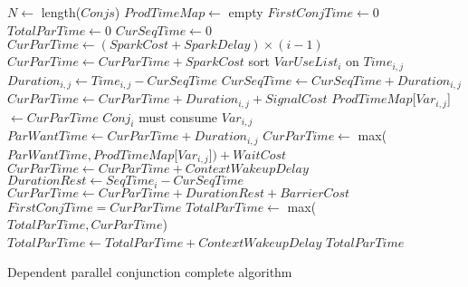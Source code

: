 {\begin{algorithm}
\begin{algorithmic}
    \State $N \gets$ length($Conjs$)
    \State $ProdTimeMap \gets$ empty
    \State $FirstConjTime \gets 0$
    \State $TotalParTime \gets 0$
        \State $CurSeqTime \gets 0$
        \State $CurParTime \gets (SparkCost + SparkDelay) \times (i-1)$
            \State $CurParTime \gets CurParTime + SparkCost$
        \EndIf
        \State sort $VarUseList_i$ on $Time_{i, j}$
            \State $Duration_{i, j} \gets Time_{i, j} - CurSeqTime$
            \State $CurSeqTime \gets CurSeqTime + Duration_{i, j}$
                \State $CurParTime \gets
                    CurParTime + Duration_{i, j} + SignalCost$
                \State $ProdTimeMap$[$Var_{i, j}$]$ \gets CurParTime$
            \Else \Comment $Conj_i$ must consume $Var_{i, j}$
                \State $ParWantTime \gets CurParTime + Duration_{i, j}$
                \State $CurParTime \gets$
                    max($ParWantTime, ProdTimeMap$[$Var_{i, j}$]$) + WaitCost$
                    \State $CurParTime \gets CurParTime + ContextWakeupDelay$
                \EndIf
            \EndIf
        \EndFor
        \State $DurationRest \gets SeqTime_i - CurSeqTime$
        \State $CurParTime \gets CurParTime + DurationRest + BarrierCost$
            \State $FirstConjTime = CurParTime$
        \EndIf
        \State $TotalParTime \gets$ max($TotalParTime, CurParTime$)
    \EndFor
        \State $TotalParTime \gets TotalParTime + ContextWakeupDelay$
    \EndIf
    \State \Return $TotalParTime$
\EndProcedure
\end{algorithmic}
\caption{Dependent parallel conjunction complete algorithm}
\label{alg:dep_par_conj_overlap_complete}
\end{algorithm}

}
